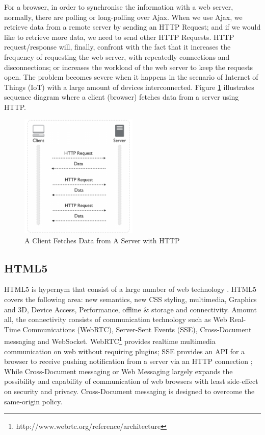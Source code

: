 For a browser, in order to synchronise the information with a web server, normally, there are polling or long-polling over Ajax. When we use Ajax, we retrieve data from a remote server by sending an HTTP Request; and if we would like to retrieve more data, we need to send other HTTP Requests. HTTP request/response will, finally, confront with the fact that it increases the frequency of requesting the web server, with repeatedly connections and disconnections; or increases the workload of the web server to keep the requests open. The problem becomes severe when it happens in the scenario of Internet of Things (IoT) with a large amount of devices interconnected. Figure \ref{fig:client-server-http} illustrates sequence diagram where a client (browser) fetches data from a server using HTTP.

\begin{figure}[t]
  \begin{center}
    \includegraphics[width=0.5\textwidth]{images/client-server-http.pdf}
    \caption{A Client Fetches Data from A Server with HTTP}
    \label{fig:client-server-http}
  \end{center}
\end{figure}

\subsection{HTML5}
\label{HTML5}

HTML5 is hypernym that consist of a large number of web technology \cite{wang2012definitive}. HTML5 covers the following area: new semantics, new CSS styling, multimedia, Graphics and 3D, Device Access, Performance, offline \& storage and connectivity. Amount all, the connectivity consists of communication technology such as Web Real-Time Communications (WebRTC), Server-Sent Events (SSE), Cross-Document messaging and WebSocket. WebRTC\footnote{http://www.webrtc.org/reference/architecture} provides realtime multimedia communication on web without requiring plugins; SSE provides an API for a browser to receive pushing notification from a server via an HTTP connection \cite{hickson2009server}; While Cross-Document messaging or Web Messaging largely expands the possibility and capability of communication of web browsers with least side-effect on security and privacy. Cross-Document messaging is designed to overcome the same-origin policy.


